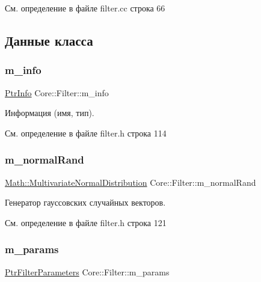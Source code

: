 См. определение в файле filter.\+cc строка 66



\subsection{Данные класса}
\hypertarget{class_core_1_1_filter_a089304c3d1695bd6b47d5bfd8fcfb574}{}\label{class_core_1_1_filter_a089304c3d1695bd6b47d5bfd8fcfb574} 
\subsubsection{\texorpdfstring{m\+\_\+info}{m\_info}}
{\footnotesize\ttfamily \hyperlink{namespace_core_a647483da8a1266d5bbd3e9bb5cd66d08}{Ptr\+Info} Core\+::\+Filter\+::m\+\_\+info\hspace{0.3cm}{\ttfamily [protected]}}

Информация (имя, тип). 

См. определение в файле filter.\+h строка 114

\hypertarget{class_core_1_1_filter_aec144b4ca46b58af15ae602a55312996}{}\label{class_core_1_1_filter_aec144b4ca46b58af15ae602a55312996} 
\subsubsection{\texorpdfstring{m\+\_\+normal\+Rand}{m\_normalRand}}
{\footnotesize\ttfamily \hyperlink{class_math_1_1_multivariate_normal_distribution}{Math\+::\+Multivariate\+Normal\+Distribution} Core\+::\+Filter\+::m\+\_\+normal\+Rand\hspace{0.3cm}{\ttfamily [protected]}}

Генератор гауссовских случайных векторов. 

См. определение в файле filter.\+h строка 121

\hypertarget{class_core_1_1_filter_ae4d42bb0f0e6299d4edbfc310e96d09f}{}\label{class_core_1_1_filter_ae4d42bb0f0e6299d4edbfc310e96d09f} 
\subsubsection{\texorpdfstring{m\+\_\+params}{m\_params}}
{\footnotesize\ttfamily \hyperlink{namespace_core_a4811af8148ba137d644b9a61a042cf03}{Ptr\+Filter\+Parameters} Core\+::\+Filter\+::m\+\_\+params\hspace{0.3cm}{\ttfamily [protected]}}

